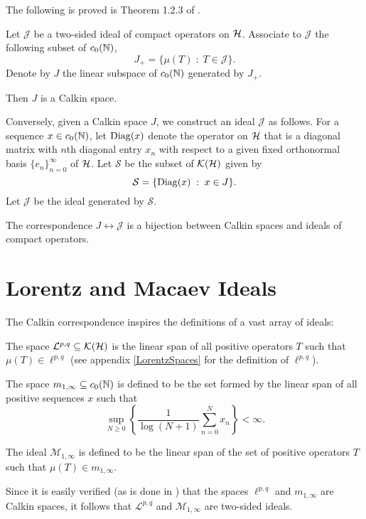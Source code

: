 The following is proved is Theorem 1.2.3 of \cite{SingularTraces}.
\begin{proposition}
    Let $\mathcal{J}$ be a two-sided ideal of compact operators on $\mathcal{H}$. Associate
    to $\mathcal{J}$ the following subset of $c_0(\mathbb{N})$,
    \begin{equation}
        J_+ = \{\mu(T)\;:\;T \in \mathcal{J}\}.
    \end{equation}
    Denote by $J$ the linear subspace of $c_0(\mathbb{N})$
    generated by $J_+$.
    
    Then $J$ is a Calkin space.
    
    
    Conversely, given a Calkin space $J$, we construct an
    ideal $\mathcal{J}$ as follows.
    For a sequence $x \in c_0(\mathbb{N})$, let $\operatorname{Diag}(x)$ denote
    the operator on $\mathcal{H}$ that is a diagonal matrix
    with $n$th diagonal entry $x_n$ with respect
    to a given fixed orthonormal basis $\{e_n\}_{n=0}^\infty$
    of $\mathcal{H}$. Let $\mathcal{S}$ be the subset of $\mathcal{K}(\mathcal{H})$
    given by
    \begin{equation}
        \mathcal{S} = \{\operatorname{Diag}(x)\;:\;x \in J\}.
    \end{equation}
    Let $\mathcal{J}$ be the ideal generated by $\mathcal{S}$.
    
    The correspondence $J \leftrightarrow \mathcal{J}$ is a bijection
    between Calkin spaces and ideals of compact operators.
\end{proposition}
    
\section{Lorentz and Macaev Ideals}
The Calkin correspondence inspires the definitions of a vast array of ideals:
\begin{definition}
    The space $\mathcal{L}^{p,q} \subseteq \mathcal{K}(\mathcal{H})$
    is the linear span of all positive operators $T$ such that $\mu(T) \in \ell^{p,q}$ (see
    appendix \ref{LorentzSpaces} for the definition of $\ell^{p,q}$).
\end{definition}
\begin{definition}
    The space $m_{1,\infty} \subseteq c_0(\mathbb{N})$ is defined to be the set
    formed by the linear span of all positive sequences $x$ such that
    \begin{equation}
        \sup_{N \geq 0} \left\{\frac{1}{\log(N+1)}\sum_{n=0}^N x_n \right\}< \infty.
    \end{equation}
    
    The ideal $\mathcal{M}_{1,\infty}$ is defined
    to be the linear span of the set of positive operators $T$
    such that $\mu(T) \in m_{1,\infty}$.
\end{definition}
Since it is easily verified (as is done in \cite{SingularTraces})
that the spaces $\ell^{p,q}$ and $m_{1,\infty}$ are Calkin spaces, it follows
that $\mathcal{L}^{p,q}$ and $\mathcal{M}_{1,\infty}$ are two-sided ideals.

